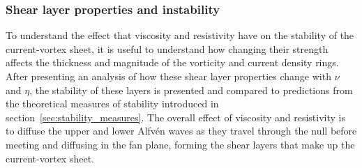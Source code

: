 
\subsubsection{Shear layer properties and instability}

To understand the effect that viscosity and resistivity have on the stability of the current-vortex sheet, it is useful to understand how changing their strength affects the thickness and magnitude of the vorticity and current density rings. After presenting an analysis of how these shear layer properties change with $\nu$ and $\eta$, the stability of these layers is presented and compared to predictions from the theoretical measures of stability introduced in section~\ref{sec:stability_measures}. The overall effect of viscosity and resistivity is to diffuse the upper and lower Alfv\'en waves as they travel through the null before meeting and diffusing in the fan plane, forming the shear layers that make up the current-vortex sheet. 

